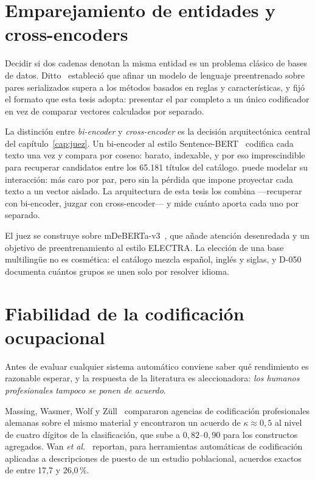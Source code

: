 \documentclass[12pt,a4paper,oneside]{report}
\begin{document}
\section{Emparejamiento de entidades y cross-encoders}
\label{sec:entitymatching}

Decidir si dos cadenas denotan la misma entidad es un problema clásico de bases de datos.
Ditto~\cite{li2020ditto} estableció que afinar un modelo de lenguaje preentrenado sobre
pares serializados supera a los métodos basados en reglas y características, y fijó el
formato que esta tesis adopta: presentar el par completo a un único codificador en vez de
comparar vectores calculados por separado.

La distinción entre \emph{bi-encoder} y \emph{cross-encoder} es la decisión arquitectónica
central del capítulo~\ref{cap:juez}. Un bi-encoder al estilo Sentence-BERT~\cite{reimers2019sbert}
codifica cada texto una vez y compara por coseno: barato, indexable, y por eso imprescindible
para recuperar candidatos entre los 65.181 títulos del catálogo.
puede modelar su interacción: más caro por par, pero sin la pérdida que impone proyectar cada
texto a un vector aislado. La arquitectura de esta tesis los combina —recuperar con
bi-encoder, juzgar con cross-encoder— y mide cuánto aporta cada uno por separado.

El juez se construye sobre mDeBERTa-v3~\cite{he2021debertav3}, que añade atención
desenredada y un objetivo de preentrenamiento al estilo ELECTRA. La elección de una base
multilingüe no es cosmética: el catálogo mezcla español, inglés y siglas, y D-050
documenta cuántos grupos se unen solo por resolver idioma.

\section{Fiabilidad de la codificación ocupacional}
\label{sec:fiabilidad}

Antes de evaluar cualquier sistema automático conviene saber qué rendimiento es
razonable esperar, y la respuesta de la literatura es aleccionadora: \emph{los humanos
profesionales tampoco se ponen de acuerdo}.

Massing, Wasmer, Wolf y Züll~\cite{massing2019} compararon agencias de codificación
profesionales alemanas sobre el mismo material y encontraron un acuerdo de
$\kappa \approx 0{,}5$ al nivel de cuatro dígitos de la clasificación, que sube a
$0{,}82$--$0{,}90$ para los constructos agregados. Wan \emph{et al.}~\cite{wan2023}
reportan, para herramientas automáticas de codificación aplicadas a descripciones de
puesto de un estudio poblacional, acuerdos exactos de entre 17,7 y 26,0\,\%.
\end{document}
